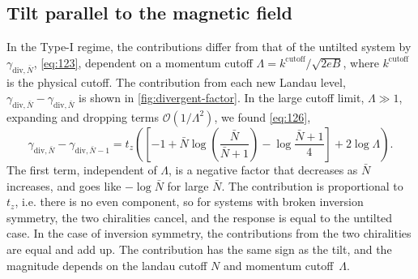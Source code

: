 \FloatBarrier
\subsection{Tilt parallel to the magnetic field}
In the Type-I regime, the contributions differ from that of the untilted system by \( \gamma_{\text{div}, \bar{N}} \), \cref{eq:123}, dependent on a momentum cutoff \( \Lambda = k^{\text{cutoff}} /\sqrt{2 e B}  \), where \(k^{\text{cutoff}}\) is the physical cutoff.
The contribution from each new Landau level, \( \gamma_{\text{div}, \bar{N}}-\gamma_{\text{div}, \bar{N}} \) is shown in \cref{fig:divergent-factor}.
In the large cutoff limit, \( \Lambda \gg 1 \), expanding and dropping terms \( \mathcal{O}(1 /\Lambda^2) \), we found \cref{eq:126},
\[
  \gamma_{\text{div}, \bar{N}} - \gamma_{\text{div}, \bar{N}-1} =
  t_z
  \left(
    \left[
      -1 + \bar{N} \log\left(\frac{\bar{N}}{\bar{N}+1}\right) - \log \frac{\bar{N}+1}{4}
    \right]
    + 2 \log\Lambda
  \right).
\]
The first term, independent of \( \Lambda \), is a negative factor that decreases as \( \bar{N} \) increases, and goes like \( -\log \bar{N} \) for large \( \bar{N} \).
The contribution is proportional to \( t_z \), i.e. there is no even component, so for systems with broken inversion symmetry, the two chiralities cancel, and the response is equal to the untilted case.
In the case of inversion symmetry, the contributions from the two chiralities are equal and add up.
The contribution has the same sign as the tilt, and the magnitude depends on the landau cutoff \( N \) and momentum cutoff~\( \Lambda \).
\nowidow[3]

